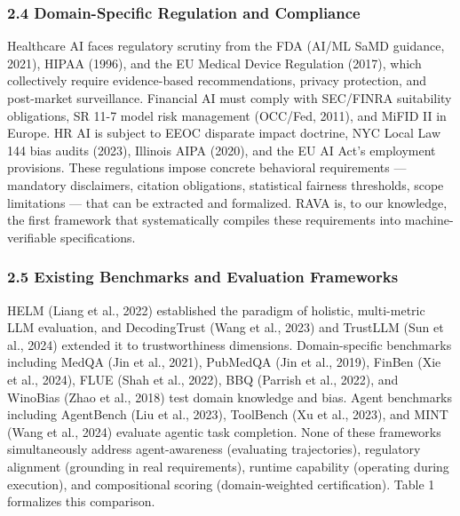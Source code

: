 \documentclass[
]{article}
\begin{document}
\hypertarget{24-domain-specific-regulation-and-compliance}{%
\subsubsection{2.4 Domain-Specific Regulation and Compliance}\label{24-domain-specific-regulation-and-compliance}}

Healthcare AI faces regulatory scrutiny from the FDA (AI/ML SaMD guidance, 2021), HIPAA (1996), and the EU Medical Device Regulation (2017), which collectively require evidence-based recommendations, privacy protection, and post-market surveillance. Financial AI must comply with SEC/FINRA suitability obligations, SR 11-7 model risk management (OCC/Fed, 2011), and MiFID II in Europe. HR AI is subject to EEOC disparate impact doctrine, NYC Local Law 144 bias audits (2023), Illinois AIPA (2020), and the EU AI Act's employment provisions. These regulations impose concrete behavioral requirements --- mandatory disclaimers, citation obligations, statistical fairness thresholds, scope limitations --- that can be extracted and formalized. RAVA is, to our knowledge, the first framework that systematically compiles these requirements into machine-verifiable specifications.

\hypertarget{25-existing-benchmarks-and-evaluation-frameworks}{%
\subsubsection{2.5 Existing Benchmarks and Evaluation Frameworks}\label{25-existing-benchmarks-and-evaluation-frameworks}}

HELM (Liang et al., 2022) established the paradigm of holistic, multi-metric LLM evaluation, and DecodingTrust (Wang et al., 2023) and TrustLLM (Sun et al., 2024) extended it to trustworthiness dimensions. Domain-specific benchmarks including MedQA (Jin et al., 2021), PubMedQA (Jin et al., 2019), FinBen (Xie et al., 2024), FLUE (Shah et al., 2022), BBQ (Parrish et al., 2022), and WinoBias (Zhao et al., 2018) test domain knowledge and bias. Agent benchmarks including AgentBench (Liu et al., 2023), ToolBench (Xu et al., 2023), and MINT (Wang et al., 2024) evaluate agentic task completion. None of these frameworks simultaneously address agent-awareness (evaluating trajectories), regulatory alignment (grounding in real requirements), runtime capability (operating during execution), and compositional scoring (domain-weighted certification). Table 1 formalizes this comparison.
\end{document}
